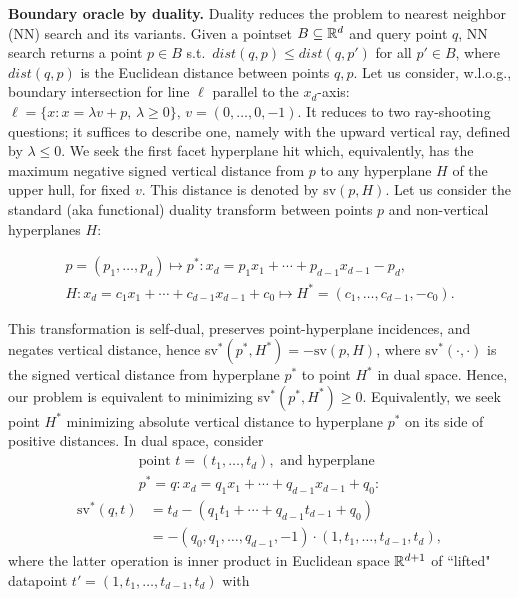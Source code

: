 \documentclass[11pt,a4paper]{article}
\begin{document}
\textbf{Boundary oracle by duality.}\label{subsec:duality}
Duality reduces the problem to nearest neighbor (NN) search and its variants. 
Given a pointset $B\subseteq{\mathbb R}^d$ and query point $q$, NN search returns a point $p\in B$ 
s.t.\ $dist(q, p) \leq dist(q, p' )$ for all $p'\in B$, where $dist(q, p )$
is the Euclidean distance between points $q, p$.
Let us consider, w.l.o.g., boundary intersection for line $\ell$
parallel to the $x_d$-axis:
$ \ell = \{ x : x=\lambda v+ p,\, \lambda\ge 0 \}, \, v=(0,\dots,0,-1).$
It reduces to two ray-shooting questions; it suffices to describe one,
namely with the upward vertical ray, defined by $\lambda\le 0$.  We seek the first facet hyperplane hit which, equivalently, has the
maximum negative signed vertical distance from $p$ to any hyperplane $H$
of the upper hull, for fixed $v$.
This distance is denoted by sv$(p, H)$.
Let us consider the standard (aka functional) duality transform
between points $p$ and non-vertical hyperplanes $H$:
\begin{small}
\begin{eqnarray*}
p =(p_1,\dots,p_d)   \mapsto
	p^*:x_d = p_1x_1 + \cdots + p_{d-1}x_{d-1} - p_d, \\
H: x_d = c_1x_1 + \cdots + c_{d-1}x_{d-1} + c_0 
	 \mapsto  H^* =(c_1,\dots, c_{d-1}, -c_0).
\end{eqnarray*}
\end{small}
This transformation is self-dual, preserves point-hyperplane incidences,
and negates vertical
distance, hence sv$^*(p^*,H^*)=-\mbox{sv}(p,H)$, where sv$^*(\cdot,\cdot)$
is the signed vertical distance from hyperplane $p^*$ to point $H^*$
in dual space.
Hence, our problem is equivalent to
minimizing sv$^*(p^*,H^*) \ge 0$.
Equivalently, we seek point $H^*$ minimizing absolute vertical distance 
to hyperplane $p^*$ on its side of positive distances.
In dual space, consider 
\begin{align}\label{Eduals}
\mbox{point } t =(t_1,\dots,t_d), \mbox{ and hyperplane }\nonumber\\
p^* = q: x_d=q_1x_1+\cdots + q_{d-1}x_{d-1}+ q_0 :
\end{align}
\begin{align*}\mbox{sv}^*(q, t) &= t_d- (q_1t_1+\cdots + q_{d-1}t_{d-1} +q_0 )\nonumber\\
 &= - (q_0,q_1,\dots ,q_{d-1} , -1) \cdot (1, t_1, \dots, t_{d-1}, t_d) ,
\end{align*}
where the latter operation is inner product in Euclidean space ${\mathbb R}^{d+1}$
of ``lifted" datapoint $t' =(1, t_1, \dots, t_{d-1}, t_d)$ with
\end{document}
